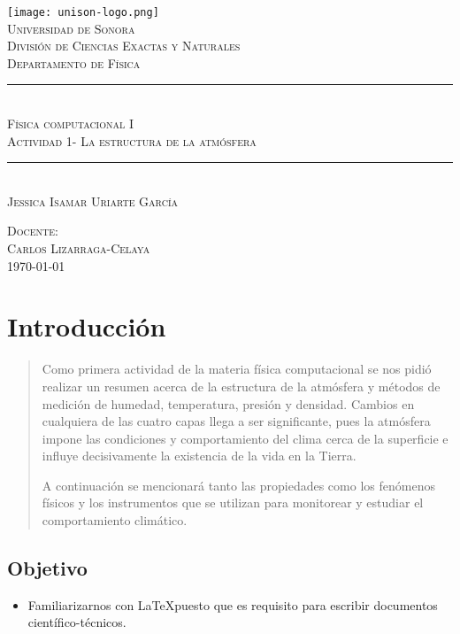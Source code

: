 \documentclass[12pt]{article}
\newcommand{\HRule}{\rule{\linewidth}{0.5mm}}
\begin{document}
    \begin{center}


\texttt{[image: unison-logo.png]}~\\[1cm]

\textsc{\LARGE Universidad de Sonora}\\[0.1cm]
\textsc{Divisi\'on de Ciencias Exactas y Naturales}\\[0.1cm]
\textsc{Departamento de F\'isica}\\[1.5cm]

\HRule \\[0.4cm]
\textsc{Física computacional I}\\[0.1cm]
\textsc{Actividad 1- La estructura de la atmósfera}
\HRule \\[1.5cm]


\textsc{Jessica Isamar Uriarte García\\[1.0cm]}

\textsc{Docente:\\Carlos Lizarraga-Celaya\\[0.1cm]}
\vfill
\textsc{\today \\[0.1cm]}
    \end{center}
\newpage

        \section{Introducción}
    \begin{abstract}
\noindent Como primera actividad de la materia física computacional se nos pidió realizar un resumen acerca de la estructura de la atmósfera y métodos de medición de humedad, temperatura, presión y densidad. Cambios en cualquiera de las cuatro capas llega a ser significante, pues la atmósfera impone las condiciones y comportamiento del clima cerca de la superficie e influye decisivamente la existencia de la vida en la Tierra. 

A continuación se mencionará tanto las propiedades como los fenómenos físicos y los instrumentos que se utilizan para monitorear y estudiar el comportamiento climático. 
    \end{abstract}
            \subsection{Objetivo}
    \begin{itemize}
        \item Familiarizarnos con \LaTeX puesto que es requisito para escribir documentos cient\'ifico-t\'ecnicos.
    \end{itemize}
\end{document}
